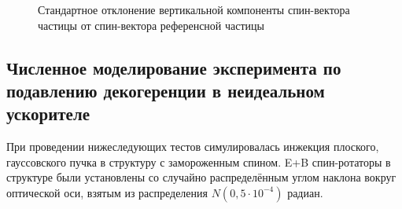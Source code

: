 \begin{figure}[h!]
	\centering
	\caption{Стандартное отклонение вертикальной компоненты спин-вектора частицы от спин-вектора референсной частицы\label{fig:decoh:SY_SD}}
\end{figure}

\subsection{Численное моделирование эксперимента по подавлению декогеренции  в неидеальном ускорителе}\label{sec:decoh:sim-imperfect}
При проведении нижеследующих тестов симулировалась инжекция
плоского, гауссовского пучка в структуру с замороженным
спином. E+B спин-ротаторы в структуре были установлены со случайно распределённым углом наклона вокруг оптической оси, взятым из распределения $N(0, 5\cdot10^{-4})$ радиан.

